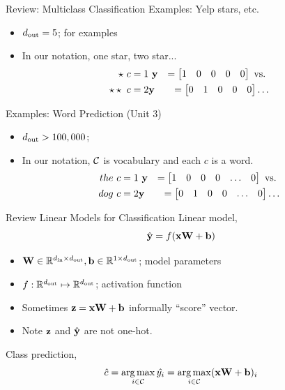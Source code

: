 \documentclass{beamer}
\begin{document}
\begin{frame}{Review: Multiclass Classification}
  Examples: Yelp stars, etc.
  \begin{itemize}
  \item ${d_{\mathrm{out}}} = 5$; for examples
  \item In our notation, one star, two star...
    \begin{eqnarray*} 
      \star \ c = 1 & \  \mathbf{y} &= \begin{bmatrix} 1 & 0 & 0 & 0 & 0  \end{bmatrix}  \mathrm {\ vs. \ } \\
    \star \star \ c = 2 & \mathbf{y} &=    \begin{bmatrix} 0 & 1 & 0 & 0 & 0 \end{bmatrix} \ldots
   \end{eqnarray*} 
  \end{itemize}
  Examples: Word Prediction (Unit 3)
  \begin{itemize}
  \item ${d_{\mathrm{out}}} > 100,000$; 
  \item In our notation, $\mathcal{C}$ is vocabulary and each $c$ is a word.   
    \begin{eqnarray*} 
      the \ c = 1 & \  \mathbf{y} &= \begin{bmatrix} 1 & 0 & 0 & 0 & \ldots & 0  \end{bmatrix}  \mathrm {\ vs. \ } \\
      dog \ c = 2 & \mathbf{y} &=    \begin{bmatrix} 0 & 1 & 0 & 0 & \ldots & 0 \end{bmatrix} \ldots
   \end{eqnarray*} 
  \end{itemize}
\end{frame}


\begin{frame}{Review Linear Models for Classification}
  Linear model,
  \[\hat{\mathbf{y}} = f(\mathbf{x} \mathbf{W} + \mathbf{b})\]    
  \begin{itemize}
  \item $\mathbf{W} \in \mathbb{R}^{{d_{\mathrm{in}}} \times {d_{\mathrm{out}}}}, \mathbf{b} \in \mathbb{R}^{1 \times {d_{\mathrm{out}}}}$; model parameters
  \item $f: \mathbb{R}^{{d_{\mathrm{out}}}} \mapsto \mathbb{R}^{{d_{\mathrm{out}}}}$; activation function 
  \item Sometimes $\mathbf{z} = \mathbf{x} \mathbf{W} + \mathbf{b}$ informally ``score'' vector. 
  \item Note $\mathbf{z}$ and $\hat{\mathbf{y}}$ are not one-hot.
  \end{itemize}

  \air 

  Class prediction,
  \[ \hat{c} = \argmax_{i \in \mcC} \hat{y_i}  = \argmax_{i \in \mcC} (\boldx \boldW + \boldb)_i    \]
\end{frame}
\end{document}
